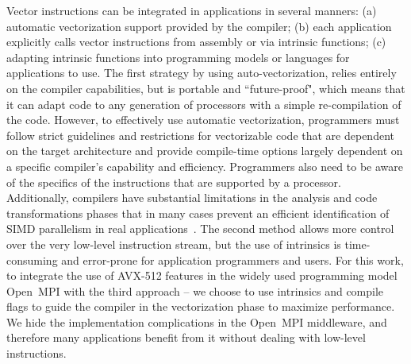 \documentclass[5p,times,twocolumn]{elsarticle}
\newcommand{\ompi}[0]{Open~MPI\xspace}
\begin{document}
Vector instructions can be integrated in applications in several manners:
(a) automatic vectorization support provided by the compiler;
(b) each application explicitly calls vector instructions from assembly or via intrinsic functions;
(c) adapting intrinsic functions into programming models or languages for applications to use.
%
The first strategy by using auto-vectorization, relies entirely on the compiler capabilities, but is portable and
``future-proof", which means that it can adapt code to any
generation of processors with a simple
re-compilation of the code. However, to effectively use automatic
vectorization, programmers must follow strict guidelines and restrictions for
vectorizable code that are dependent on the target architecture and provide compile-time options largely dependent
on a specific compiler's capability and efficiency.
%
Programmers also need to be aware of the specifics of the
instructions that are supported by a processor.  Additionally,
compilers have substantial limitations in the analysis and code
transformations phases that in many cases prevent an efficient identification of SIMD
parallelism in real applications~\cite{autoEvaluation}.
%
The second method allows more control over the very low-level
instruction stream, but the use of intrinsics is time-consuming and
error-prone for application programmers and users.
%
For this work, to integrate the use of AVX-512 features in the widely used programming
model \ompi with the third approach -- we choose to use intrinsics and
compile flags to guide the compiler in the vectorization phase to maximize performance.
We hide the implementation complications in the \ompi middleware, and therefore many
applications benefit from it without dealing with low-level instructions.
\end{document}
